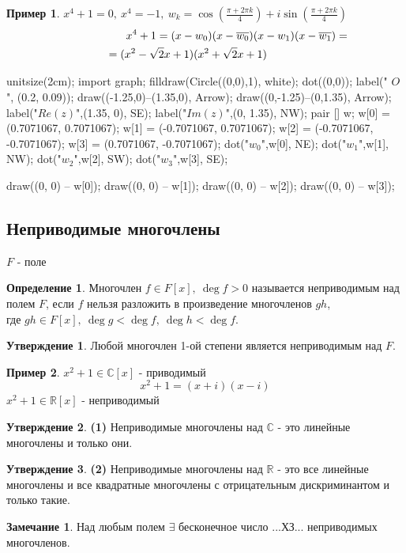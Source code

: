 \documentclass[a4paper, 12pt]{article}
\newcommand{\R}{\mathbb R}
\newcommand\tab[1][.5cm]{\hspace*{#1}}
\theoremstyle{definition}
\newtheorem*{definition}{Определение}
\newtheorem*{subtheorem}{Утверждение}
\newtheorem*{remark}{Замечание}
\newtheorem*{example1}{Пример}
\begin{document}
  \begin{example1}
    $x^4 +1=0, \ x^4 = -1, \ w_k = \cos(\frac{\pi+2\pi k}{4})+ i\sin (\frac{\pi+2\pi k}{4})$
    \begin{multline*}
      \tab[2cm]x^4 +1= (x-w_0)(x-\overline{w_0})(x-w_1)(x-\overline{w_1}) = \\
      = (x^2 - \sqrt{2}x + 1)(x^2 + \sqrt{2}x + 1)\tab[1cm]
      \
    \end{multline*}
    \begin{center}
      \begin{asy}
        unitsize(2cm);
        import graph;
        filldraw(Circle((0,0),1), white);
        dot((0,0));
        label(" $O$ ", (0.2, 0.09));
        draw((-1.25,0)--(1.35,0), Arrow);
        draw((0,-1.25)--(0,1.35), Arrow);
        label("$Re(z)$",(1.35, 0), SE); 
        label("$Im(z)$",(0, 1.35), NW);
        pair [] w;
        w[0] = (0.7071067, 0.7071067);
        w[1] = (-0.7071067, 0.7071067);
        w[2] = (-0.7071067, -0.7071067);
        w[3] = (0.7071067, -0.7071067);
        dot("$w_{0}$",w[0], NE); 
        dot("$w_{1}$",w[1], NW);
        dot("$w_{2}$",w[2], SW);
        dot("$w_{3}$",w[3], SE);
    
        draw((0, 0) -- w[0]);
        draw((0, 0) -- w[1]);
        draw((0, 0) -- w[2]);
        draw((0, 0) -- w[3]);
      \end{asy}
    \end{center}
  \end{example1}

  \subsection{Неприводимые многочлены}
  $F$ - поле
  \begin{definition}
    Многочлен $f \in F[x], \ \deg f > 0$ называется неприводимым над полем $F$, если $f$ нельзя разложить в произведение многочленов $gh$, \\где $gh \in F[x], \ \deg g < \deg f, \ \deg h < \deg f$.
  \end{definition}
  \begin{subtheorem}
    Любой многочлен 1-ой степени является неприводимым над $F$. 
  \end{subtheorem}
  \begin{example1} 
    $x^2 + 1 \in \mathbb{C}[x]$ - приводимый
    $$x^2 + 1 = (x+i)(x-i)$$
    \tab[11cm]$x^2 + 1 \in \R[x]$ - неприводимый  
  \end{example1} 
  \begin{subtheorem}\textbf{(1)}
    Неприводимые многочлены над $\mathbb{C}$ - это линейные многочлены и только они. 
  \end{subtheorem}
  \begin{subtheorem}\textbf{(2)}
    Неприводимые многочлены над $\R$ - это все линейные многочлены и все квадратные многочлены с отрицательным дискриминантом и только такие.  
  \end{subtheorem}
  \begin{remark}
    Над любым полем $\exists$ бесконечное число ...ХЗ... неприводимых многочленов.  
  \end{remark}   

\end{document}
